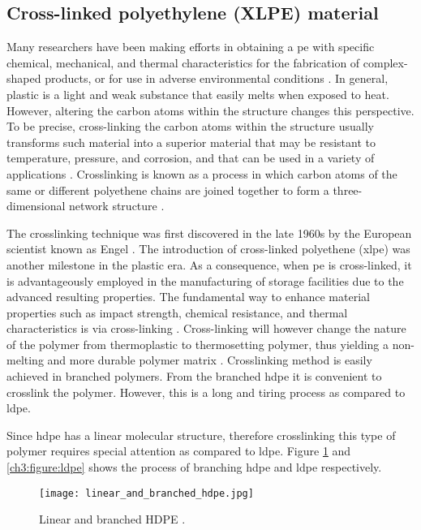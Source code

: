 \subsection{Cross-linked polyethylene (XLPE) material}
Many researchers have been making efforts in obtaining a \acrshort{pe} with specific chemical, mechanical, and thermal characteristics for the fabrication of complex-shaped products, or for use in adverse environmental conditions \cite{kurtz2009cross}. In general, plastic is a light and weak substance that easily melts when exposed to heat. However, altering the carbon atoms within the structure changes this perspective. To be precise, cross-linking the carbon atoms within the structure usually transforms such material into a superior material that may be resistant to temperature, pressure, and corrosion, and that can be used in a variety of applications \cite{peacock2000handbook}. Crosslinking is known as a process in which carbon atoms of the same or different polyethene chains are joined together to form a three-dimensional network structure \cite{kurtz2009cross}.

The crosslinking technique was first discovered in the late 1960s by the European scientist known as Engel \cite{peacock2000handbook}. The introduction of cross-linked polyethene (\acrshort{xlpe}) was another milestone in the plastic era. As a consequence, when \acrshort{pe} is cross-linked, it is advantageously employed in the manufacturing of storage facilities due to the advanced resulting properties. The fundamental way to enhance material properties such as impact strength, chemical resistance, and thermal characteristics is via cross-linking \cite{andreopoulos1986mechanical}. Cross-linking will however change the nature of the polymer from thermoplastic to thermosetting polymer, thus yielding a non-melting and more durable polymer matrix \cite{clemens2017microstructure}. Crosslinking method is easily achieved in branched polymers. From the branched \acrshort{hdpe} it is convenient to crosslink the polymer. However, this is a long and tiring process as compared to \acrshort{ldpe}.

Since \acrshort{hdpe} has a linear molecular structure, therefore crosslinking this type of polymer requires special attention as compared to \acrshort{ldpe}. Figure \ref{ch3:figure:hdpe} and \ref{ch3:figure:ldpe} shows the process of branching \acrshort{hdpe} and \acrshort{ldpe} respectively.
 
\begin{figure}[H]
    \centering
    \texttt{[image: linear\_and\_branched\_hdpe.jpg]}
    \caption{Linear and branched HDPE \cite{gabriel1998history}.}
    \label{ch3:figure:hdpe}
\end{figure}

